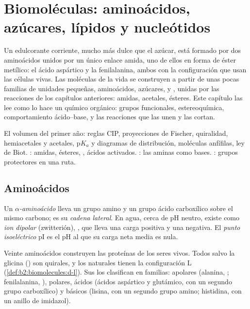 \chapter{Biomoléculas: aminoácidos, azúcares, lípidos y nucleótidos}\label{ch:b2:biomolecules}

Un edulcorante corriente, mucho más dulce que el azúcar, está formado por dos aminoácidos unidos por un único enlace amida, uno
de ellos en forma de éster metílico: el ácido aspártico y la fenilalanina, ambos con la configuración que usan las células
vivas. Las moléculas de la vida se construyen a partir de unas pocas familias de unidades pequeñas, aminoácidos, azúcares,  y , unidas por las reacciones de los capítulos anteriores: amidas, acetales, ésteres. Este
capítulo las lee como lo hace un químico orgánico: grupos funcionales, estereoquímica, comportamiento
ácido--base, y las reacciones que las unen y las cortan.

\begin{recall}
El volumen del primer año: reglas CIP, proyecciones de Fischer, quiralidad, hemiacetales y acetales, $\mathrm pK_a$
y diagramas de distribución, moléculas anfífilas, ley de Biot. : amidas,
ésteres, , ácidos activados. : las aminas como bases.
: grupos protectores en una ruta.
\end{recall}

\section{Aminoácidos}

\begin{definition}[Aminoácidos]\label{def:b2:biomolecules:amino-acid}
Un \emph{$\alpha$-aminoácido}  lleva un
grupo amino y un grupo ácido carboxílico sobre el mismo carbono;  es su \emph{cadena
lateral}. En agua, cerca de pH neutro, existe como \emph{ion dipolar} (zwitterión),
, que lleva una carga positiva y una negativa. El \emph{punto
isoeléctrico} pI es el pH al que su carga neta media es nula.
\end{definition}

Veinte aminoácidos construyen las proteínas de los seres vivos. Todos salvo la glicina () son quirales, y
los naturales tienen la configuración L (\cref{def:b2:biomolecules:d-l}). Sus  los clasifican
en familias: apolares (alanina, ; fenilalanina, ), polares, ácidos
(ácidos aspártico y glutámico, con un segundo grupo carboxílico) y básicos (lisina, con un segundo grupo
amino; histidina, con un anillo de imidazol).

